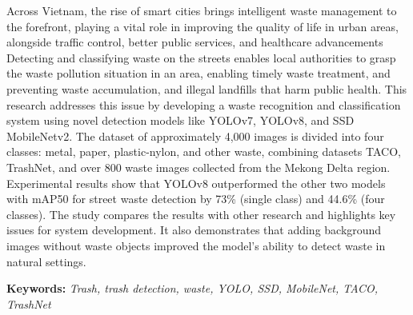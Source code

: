 \documentclass[./thesis.tex]{subfiles}
\begin{document}

{\fontsize{13}{12} \selectfont
Across Vietnam, the rise of smart cities brings intelligent waste management to the forefront, playing a vital role in improving the quality of life in urban areas, alongside traffic control, better public services, and healthcare advancements
Detecting and classifying waste on the streets enables local authorities to grasp the waste pollution situation in an area, enabling timely waste treatment, and preventing waste accumulation, and illegal landfills that harm public health.
This research addresses this issue by developing a waste recognition and classification system using novel detection models like YOLOv7, YOLOv8, and SSD MobileNetv2.
The dataset of approximately 4,000 images is divided into four classes: metal, paper, plastic-nylon, and other waste, combining datasets TACO, TrashNet, and over 800 waste images collected from the Mekong Delta region.
Experimental results show that YOLOv8 outperformed the other two models with mAP50 for street waste detection by 73\% (single class) and 44.6\% (four classes).
The study compares the results with other research and highlights key issues for system development. It also demonstrates that adding background images without waste objects improved the model's ability to detect waste in natural settings.

}
\bigskip

{\bf Keywords:} \textit{Trash, trash detection, waste, YOLO, SSD, MobileNet, TACO, TrashNet}
\end{document}
